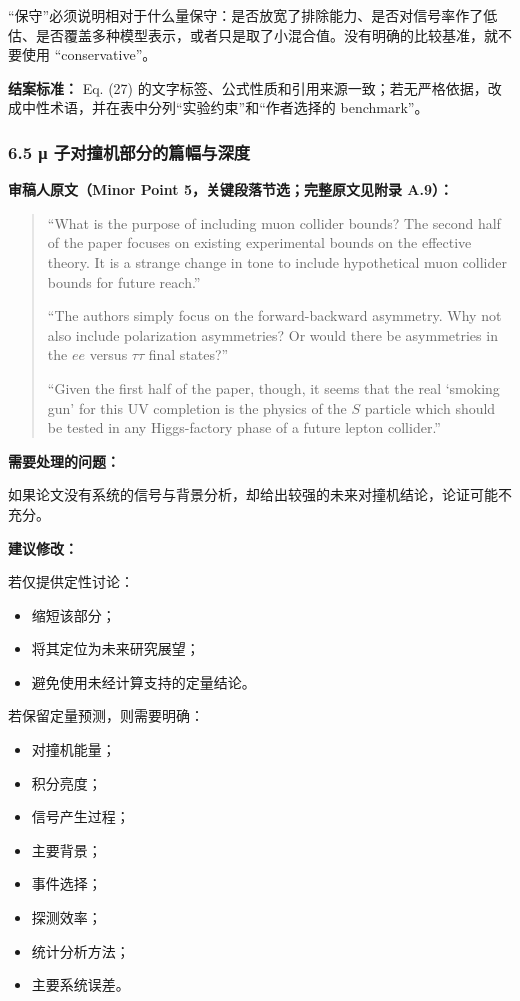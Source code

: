 \documentclass[
]{article}
\providecommand{\tightlist}{%
  \setlength{\itemsep}{0pt}\setlength{\parskip}{0pt}}
\begin{document}
``保守''必须说明相对于什么量保守：是否放宽了排除能力、是否对信号率作了低估、是否覆盖多种模型表示，或者只是取了小混合值。没有明确的比较基准，就不要使用
``conservative''。

\textbf{结案标准：} Eq. (27)
的文字标签、公式性质和引用来源一致；若无严格依据，改成中性术语，并在表中分列``实验约束''和``作者选择的
benchmark''。

\subsubsection{6.5 μ
子对撞机部分的篇幅与深度}\label{ux3bc-ux5b50ux5bf9ux649eux673aux90e8ux5206ux7684ux7bc7ux5e45ux4e0eux6df1ux5ea6}

\textbf{审稿人原文（Minor Point 5，关键段落节选；完整原文见附录 A.9）：}

\begin{quote}
``What is the purpose of including muon collider bounds? The second half
of the paper focuses on existing experimental bounds on the effective
theory. It is a strange change in tone to include hypothetical muon
collider bounds for future reach.''

``The authors simply focus on the forward-backward asymmetry. Why not
also include polarization asymmetries? Or would there be asymmetries in
the \(ee\) versus \(\tau\tau\) final states?''

``Given the first half of the paper, though, it seems that the real
`smoking gun' for this UV completion is the physics of the \(S\)
particle which should be tested in any Higgs-factory phase of a future
lepton collider.''
\end{quote}

\textbf{需要处理的问题：}

如果论文没有系统的信号与背景分析，却给出较强的未来对撞机结论，论证可能不充分。

\textbf{建议修改：}

若仅提供定性讨论：

\begin{itemize}
\tightlist
\item
  缩短该部分；
\item
  将其定位为未来研究展望；
\item
  避免使用未经计算支持的定量结论。
\end{itemize}

若保留定量预测，则需要明确：

\begin{itemize}
\tightlist
\item
  对撞机能量；
\item
  积分亮度；
\item
  信号产生过程；
\item
  主要背景；
\item
  事件选择；
\item
  探测效率；
\item
  统计分析方法；
\item
  主要系统误差。
\end{itemize}
\end{document}
